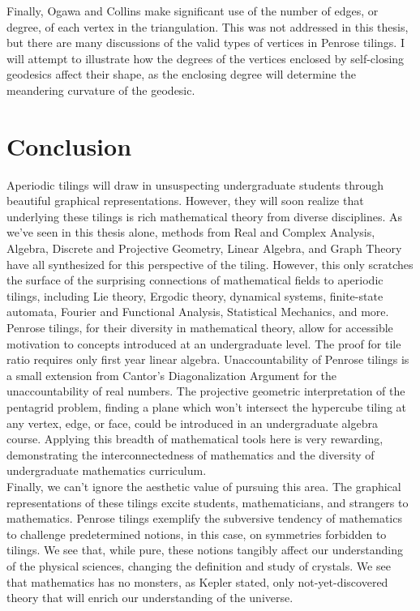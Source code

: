 \documentclass[
  oneside,
  11pt, a4paper,
  footinclude=true,
  headinclude=true,
  cleardoublepage=empty
]{scrbook}
\begin{document}
Finally, Ogawa and Collins make significant use of the number of edges, or degree, of each vertex in the triangulation. This was not addressed in this thesis, but there are many discussions of the valid types of vertices in Penrose tilings. I will attempt to illustrate how the degrees of the vertices enclosed by self-closing geodesics affect their shape, as the enclosing degree will determine the meandering curvature of the geodesic. 

\chapter{Conclusion}
Aperiodic tilings will draw in unsuspecting undergraduate students through beautiful graphical representations.  However, they will soon realize that underlying these tilings is rich mathematical theory from diverse disciplines. As we've seen in this thesis alone, methods from Real and Complex Analysis, Algebra, Discrete and Projective Geometry, Linear Algebra, and Graph Theory have all synthesized for this perspective of the tiling. However, this only scratches the surface of the surprising connections of mathematical fields to aperiodic tilings, including Lie theory, Ergodic theory, dynamical systems, finite-state automata, Fourier and Functional Analysis, Statistical Mechanics, and more.\\
Penrose tilings, for their diversity in mathematical theory, allow for accessible motivation to concepts introduced at an undergraduate level. The proof for tile ratio requires only first year linear algebra. Unaccountability of Penrose tilings is a small extension from Cantor's Diagonalization Argument for the unaccountability of real numbers. The projective geometric interpretation of the pentagrid problem, finding a plane which won't intersect the hypercube tiling at any vertex, edge, or face, could be introduced in an undergraduate algebra course. Applying this breadth of mathematical tools here is very rewarding, demonstrating the interconnectedness of mathematics and the diversity of undergraduate mathematics curriculum.\\
Finally, we can't ignore the aesthetic value of pursuing this area. The graphical representations of these tilings excite students, mathematicians, and strangers to mathematics. Penrose tilings exemplify the subversive tendency of mathematics to challenge predetermined notions, in this case, on symmetries forbidden to tilings. We see that, while pure, these notions tangibly affect our understanding of the physical sciences, changing the definition and study of crystals. We see that mathematics has no monsters, as Kepler stated, only not-yet-discovered theory that will enrich our understanding of the universe. 





    
\end{document}
